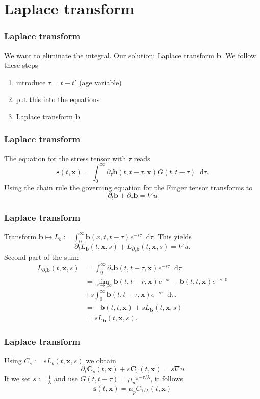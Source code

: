 \documentclass[12pt,a4paper]{beamer}
\theoremstyle{definition}
\theoremstyle{plain}
\newcommand{\bfb}{\bm{b}}
\newcommand{\bfs}{\bm{s}}
\newcommand{\bfC}{\bm{C}}
\newcommand{\bfx}{\bm{x}}
\newcommand{\D}{\mathop{}\!\mathrm{d}}
\begin{document}
\section{Laplace transform}
\begin{frame}
    \frametitle{Laplace transform}
    We want to eliminate the integral. Our solution: Laplace transform $\bfb$. We follow these steps 
    \begin{enumerate}[<+->]
        \item introduce $\tau= t-t'$ (age variable)
        \item put this into the equations
        \item Laplace transform $\bfb$
    \end{enumerate}
\end{frame}
\begin{frame}
    \frametitle{Laplace transform}
    The equation for the stress tensor with $\tau$ reads
    \begin{equation*}
        \bfs(t,\bfx)=\int_0^\infty\partial_\tau\bfb(t,t-\tau,\bfx)G(t,t-\tau)\D\tau.
    \end{equation*}
   Using the chain rule the governing equation for the Finger tensor transforms to  
   \begin{equation*}
   \partial_t \bfb +\partial_\tau\bfb=\nabla u
   \end{equation*}
\end{frame}
\begin{frame}
    \frametitle{Laplace transform}
    Transform $\bfb\mapsto L_b:=\int_0^\infty \bfb(x,t,t-\tau)e^{-s\tau}\D \tau$. This yields
    \begin{equation*}
    \partial_tL_{\bfb}(t,\bfx,s) + L_{\partial_\tau\bfb}(t,\bfx,s) = \nabla u.
    \end{equation*}
    Second part of the sum:
        \begin{align*}
        L_{\partial_\tau\bfb}(t,\bfx,s) &= \int_0^\infty\partial_\tau\bfb(t,t-\tau,\bfx)e^{-s\tau}\D\tau\\ &=\lim_{r\to\infty}\bfb(t,t-r,\bfx)e^{-sr}-\bfb(t,t,\bfx)e^{-s\cdot 0}\\&+s\int_0^\infty\bfb(t,t-\tau,\bfx)e^{-s\tau}\D\tau.\\
        &= -\bfb(t,t,\bfx) +sL_{\bfb}(t,\bfx, s)\\
        &= sL_{\bfb}(t,\bfx,s).
        \end{align*}
\end{frame}
\begin{frame}
    \frametitle{Laplace transform}
    Using $C_s:=sL_b(t,\bfx,s)$ we obtain
    \begin{equation*}
         \partial_t\bfC_s(t,\bfx)+s\bfC_s(t,\bfx)=s\nabla u
    \end{equation*}
    If we set $s:=\frac{1}{\lambda}$ and use $G(t,t-\tau)=\mu_pe^{-\tau/\lambda}$, it follows
    \begin{equation*}
        \bfs(t,\bfx)=\mu_pC_{1/\lambda}(t,\bfx)
    \end{equation*}
\end{frame}
\end{document}
